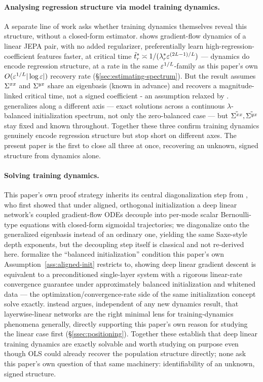 \paragraph{Analysing regression structure via model training dynamics.}
A separate line of work asks whether training dynamics themselves reveal this
structure, without a closed-form estimator. \citet{Littwin2024} shows gradient-flow
dynamics of a linear JEPA pair, with no added regularizer, preferentially learn
high-regression-coefficient features faster, at critical time
$\tilde t_r^* \asymp 1/(\lambda_r^* \varepsilon^{(2L-1)/L})$ — dynamics do encode regression
structure, at a rate in the same $\varepsilon^{1/L}$-family as this paper's own
$O(\varepsilon^{1/L}|\log\varepsilon|)$ recovery rate (\S\ref{sec:estimating-spectrum}). But the
result assumes $\Sigma^{xx}$ and $\Sigma^{yx}$ share an eigenbasis (known in advance) and recovers a
magnitude-linked critical time, not a signed coefficient - an assumption relaxed by \citet{Goh2026ordering}.
\citet{Domine2024} generalizes along a different axis — exact solutions across a continuous
$\lambda$-balanced initialization spectrum, not only the zero-balanced case — but
$\tilde{\Sigma^{xx}},\tilde{\Sigma^{yx}}$ stay fixed and known throughout. 
Together these three confirm training dynamics genuinely encode
regression structure but stop short on different axes. The present paper is the first to close all three at once,
recovering an unknown, signed structure from dynamics alone.

\paragraph{Solving training dynamics.}
This paper's own proof strategy inherits its central diagonalization step from
\citet{Saxe2014,Saxe2019}, who first showed that under aligned, orthogonal
initialization a deep linear network's coupled gradient-flow ODEs decouple into
per-mode scalar Bernoulli-type equations with closed-form sigmoidal trajectories; we
diagonalize onto the generalized eigenbasis instead of an ordinary one, yielding the
same Saxe-style depth exponents, but the decoupling step itself is classical and not
re-derived here. \citet{Arora2018,Arora2019} formalize the ``balanced initialization''
condition this paper's own Assumption~\ref{ass:aligned-init} restricts to, showing deep
linear gradient descent is equivalent to a preconditioned single-layer system with a
rigorous linear-rate convergence guarantee under approximately balanced initialization
and whitened data --- the optimization/convergence-rate side of the same initialization
concept \citeauthor{Saxe2014} solve exactly. \citet{Nam2025} instead argues,
independent of any new dynamics result, that layerwise-linear networks are the right
minimal lens for training-dynamics phenomena generally, directly supporting this
paper's own reason for studying the linear case first (\S\ref{ssec:positioning}).
Together these establish that deep linear training dynamics are exactly solvable and worth studying on purpose
even though OLS could already recover the population structure directly; none ask this
paper's own question of that same machinery: identifiability of an unknown, signed
structure.

